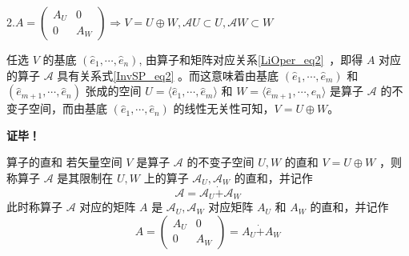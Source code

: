 2.$
A=\begin{pmatrix}
A_U&0\\
0&A_W
\end{pmatrix}\Rightarrow V=U\oplus W,\mathcal{A}U\subset U,\mathcal{A}W\subset W
$

任选 $V$ 的基底 $(\hat e_1,\cdots,\hat e_n)$, 由算子和矩阵对应关系\autoref{LiOper_eq2}~，即得 $A$ 对应的算子 $\mathcal{A}$ 具有关系式\autoref{InvSP_eq2} 。而这意味着由基底 $(\hat e_1,\cdots,\hat e_m)$ 和 $(\hat e_{m+1},\cdots,\hat e_n)$ 张成的空间 $U=\langle\hat e_1,\cdots,\hat e_m\rangle$ 和 $W=\langle\hat e_{m+1},\cdots,\hat e_n\rangle$ 是算子 $\mathcal{A}$ 的不变子空间，而由基底 $(\hat e_1,\cdots,\hat e_n)$ 的线性无关性可知，$V=U\oplus W$。

\textbf{证毕！}


\begin{definition}{算子的直和}
若矢量空间 $V$ 是算子 $\mathcal{A}$ 的不变子空间 $U,W$ 的直和 $V=U\oplus W$ ，则称算子 $\mathcal{A}$ 是其限制在 $U,W$ 上的算子 $\mathcal{A}_U,\mathcal{A}_W$ 的直和，并记作
\begin{equation}
\mathcal{A}=\mathcal{A}_U\dot{+}\mathcal{A}_W
\end{equation}
此时称算子 $\mathcal{A}$ 对应的矩阵 $A$ 是 $\mathcal{A}_U,\mathcal{A}_W$ 对应矩阵 $A_U$ 和 $A_W$ 的直和，并记作
\begin{equation}
A=\begin{pmatrix}
A_U&0\\
0&A_W
\end{pmatrix}=A_U\dot{+}A_W
\end{equation}

\end{definition}